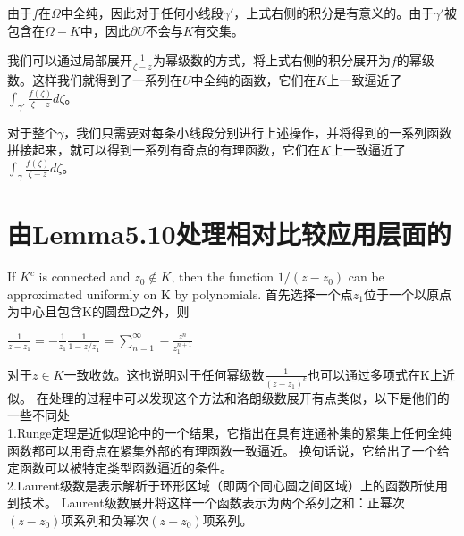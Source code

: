 \documentclass[12pt, a4paper, oneside]{article}
\begin{document}
\begin{spacing}{2.0}
由于$f$在$\Omega$中全纯，因此对于任何小线段$\gamma'$，上式右侧的积分是有意义的。由于$\gamma'$被包含在$\Omega-K$中，因此$\partial U$不会与$K$有交集。

我们可以通过局部展开$\frac{1}{\zeta-z}$为幂级数的方式，将上式右侧的积分展开为$f$的幂级数。这样我们就得到了一系列在$U$中全纯的函数，它们在$K$上一致逼近了$\displaystyle\int_{\gamma'}\frac{f(\zeta)}{\zeta-z}d\zeta$。

对于整个$\gamma$，我们只需要对每条小线段分别进行上述操作，并将得到的一系列函数拼接起来，就可以得到一系列有奇点的有理函数，它们在$K$上一致逼近了$\displaystyle\int_{\gamma}\frac{f(\zeta)}{\zeta-z}d\zeta$。


\section{由Lemma5.10处理相对比较应用层面的}
If $K^c$ is connected and $z_0 \notin K$, then the function $1/(z − z_0)$ can be approximated uniformly on K by polynomials.
首先选择一个点$z_1$位于一个以原点为中心且包含K的圆盘D之外，则
\begin{center}
    $\displaystyle\frac{1}{z-z_1} = -\frac{1}{z_1}\frac{1}{1-z/z_1} = \sum_{n = 1}^{\infty}-\frac{z^n}{z_1^{n+1}}$
\end{center}
对于$z\in K$一致收敛。这也说明对于任何幂级数$\frac{1}{(z-z_1)^k}$也可以通过多项式在K上近似。
在处理的过程中可以发现这个方法和洛朗级数展开有点类似，以下是他们的一些不同处\\
1.Runge定理是近似理论中的一个结果，它指出在具有连通补集的紧集上任何全纯函数都可以用奇点在紧集外部的有理函数一致逼近。
换句话说，它给出了一个给定函数可以被特定类型函数逼近的条件。\\

2.Laurent级数是表示解析于环形区域（即两个同心圆之间区域）上的函数所使用到技术。
Laurent级数展开将这样一个函数表示为两个系列之和：正幂次$(z-z_0)$项系列和负幂次$(z-z_0)$项系列。













\end{spacing}{}



\end{document}
